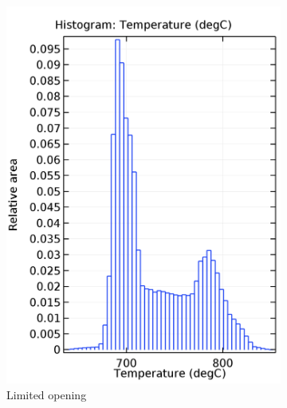 \documentclass{elsarticle}
\begin{document}
\begin{figure}
    \centering
    \begin{subfigure}[b]{0.42\textwidth}
    \centering
     \includegraphics[width=\textwidth]{images/diffusion/mk1/SS/flow_opti/hist_init.png}
    \caption{Limited opening}
    \end{subfigure}%
    ~ 
    \begin{subfigure}[b]{0.42\textwidth}
        \centering

\end{subfigure}
\end{figure}
\end{document}
